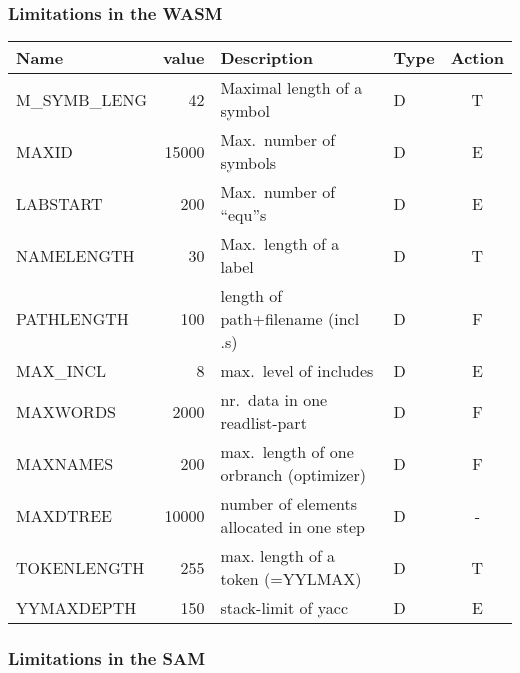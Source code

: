 \subsubsection{Limitations in the WASM}

\begin{tabular}{|l|r|l|l|c|}
Name & value & Description & Type & Action \\
\hline
M\_SYMB\_LENG & 42 & Maximal length of a symbol & D & T\\
MAXID & 15000 & Max.~number of symbols & D & E \\
LABSTART & 200 & Max.~number of ``equ''s & D & E\\
NAMELENGTH & 30 & Max.~length of a label & D & T\\
PATHLENGTH & 100 & length of path+filename (incl .s) & D & F\\
MAX\_INCL & 8 & max.~level of includes & D & E\\
MAXWORDS & 2000 & nr.~data in one readlist-part & D & F\\
MAXNAMES & 200 & max.~length of one orbranch (optimizer) & D & F\\
MAXDTREE & 10000 & number of elements allocated in one step & D & -\\
TOKENLENGTH & 255 & max. length of a token (=YYLMAX) & D & T \\
YYMAXDEPTH & 150 & stack-limit of yacc & D & E \\
\hline
\end{tabular}

\subsubsection{Limitations in the SAM}

